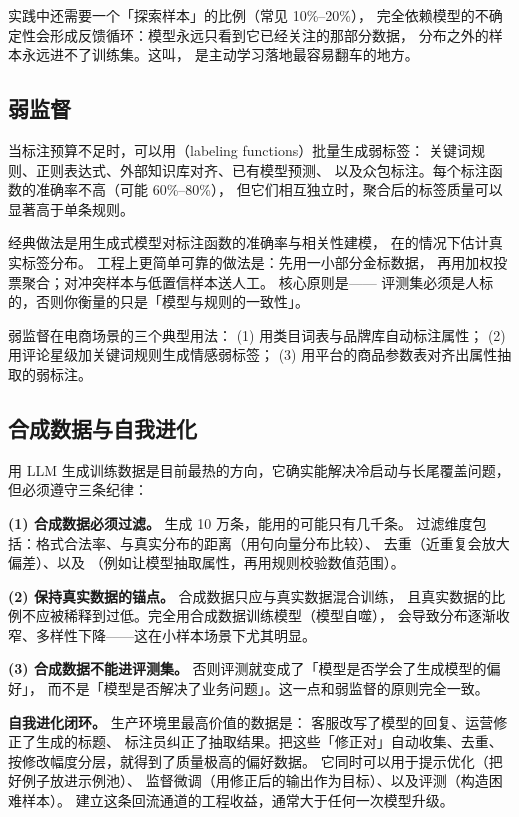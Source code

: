 实践中还需要一个「探索样本」的比例（常见 10\%--20\%），
完全依赖模型的不确定性会形成反馈循环：模型永远只看到它已经关注的那部分数据，
分布之外的样本永远进不了训练集。这叫，
是主动学习落地最容易翻车的地方。

\subsection{弱监督}

当标注预算不足时，可以用（labeling functions）批量生成弱标签：
关键词规则、正则表达式、外部知识库对齐、已有模型预测、
以及众包标注。每个标注函数的准确率不高（可能 60\%--80\%），
但它们相互独立时，聚合后的标签质量可以显著高于单条规则。

经典做法是用生成式模型对标注函数的准确率与相关性建模，
在的情况下估计真实标签分布。
工程上更简单可靠的做法是：先用一小部分金标数据，
再用加权投票聚合；对冲突样本与低置信样本送人工。
核心原则是——
评测集必须是人标的，否则你衡量的只是「模型与规则的一致性」。

弱监督在电商场景的三个典型用法：
(1) 用类目词表与品牌库自动标注属性；
(2) 用评论星级加关键词规则生成情感弱标签；
(3) 用平台的商品参数表对齐出属性抽取的弱标注。

\subsection{合成数据与自我进化}

用 LLM 生成训练数据是目前最热的方向，它确实能解决冷启动与长尾覆盖问题，
但必须遵守三条纪律：

\textbf{(1) 合成数据必须过滤。} 生成 10 万条，能用的可能只有几千条。
过滤维度包括：格式合法率、与真实分布的距离（用句向量分布比较）、
去重（近重复会放大偏差）、以及
（例如让模型抽取属性，再用规则校验数值范围）。

\textbf{(2) 保持真实数据的锚点。} 合成数据只应与真实数据混合训练，
且真实数据的比例不应被稀释到过低。完全用合成数据训练模型（模型自噬），
会导致分布逐渐收窄、多样性下降——这在小样本场景下尤其明显。

\textbf{(3) 合成数据不能进评测集。} 否则评测就变成了「模型是否学会了生成模型的偏好」，
而不是「模型是否解决了业务问题」。这一点和弱监督的原则完全一致。

\textbf{自我进化闭环。} 生产环境里最高价值的数据是：
客服改写了模型的回复、运营修正了生成的标题、
标注员纠正了抽取结果。把这些「修正对」自动收集、去重、
按修改幅度分层，就得到了质量极高的偏好数据。
它同时可以用于提示优化（把好例子放进示例池）、
监督微调（用修正后的输出作为目标）、以及评测（构造困难样本）。
建立这条回流通道的工程收益，通常大于任何一次模型升级。

